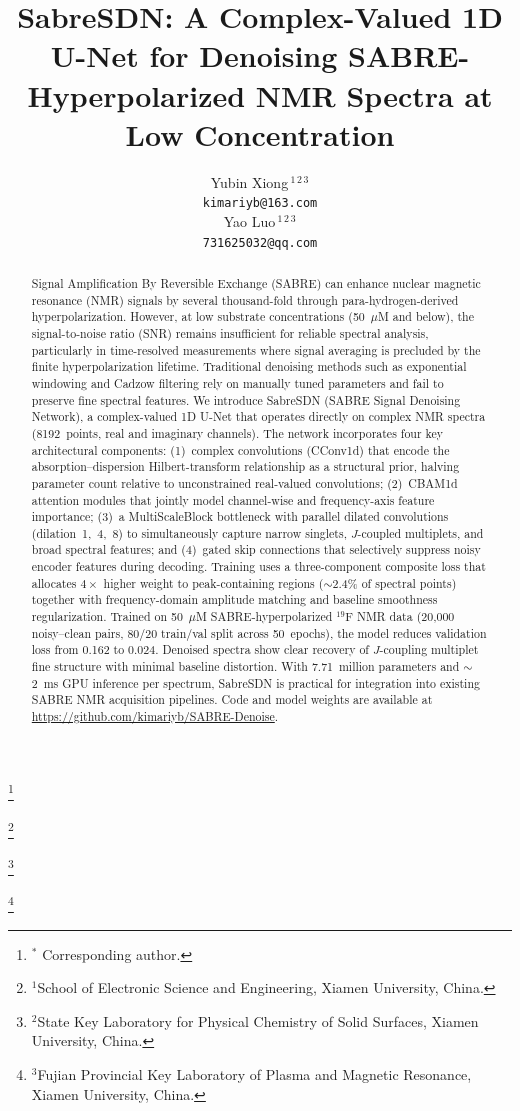 \documentclass{article}
\title{SabreSDN: A Complex-Valued 1D U-Net for Denoising SABRE-Hyperpolarized NMR Spectra at Low Concentration}
\author{%
  Yubin Xiong\,$^{1\,2\,3}$ \\
  \texttt{kimariyb@163.com} \\
  \And
  Yao Luo\footnotemark[1]\;\,${}^{1\,2\,3}$\\
  \texttt{731625032@qq.com} 
}
\newcommand\blfootnote[1]{%
  \begingroup
  \renewcommand\thefootnote{}\footnote{#1}%
  \addtocounter{footnote}{-1}%
  \endgroup
}
\begin{document}
\maketitle

\begin{abstract}
Signal Amplification By Reversible Exchange (SABRE) can enhance nuclear magnetic resonance (NMR) signals by several thousand-fold through para-hydrogen-derived hyperpolarization. However, at low substrate concentrations (50~$\mu$M and below), the signal-to-noise ratio (SNR) remains insufficient for reliable spectral analysis, particularly in time-resolved measurements where signal averaging is precluded by the finite hyperpolarization lifetime. Traditional denoising methods such as exponential windowing and Cadzow filtering rely on manually tuned parameters and fail to preserve fine spectral features. We introduce SabreSDN (SABRE Signal Denoising Network), a complex-valued 1D U-Net that operates directly on complex NMR spectra (8192~points, real and imaginary channels). The network incorporates four key architectural components: (1)~complex convolutions (CConv1d) that encode the absorption--dispersion Hilbert-transform relationship as a structural prior, halving parameter count relative to unconstrained real-valued convolutions; (2)~CBAM1d attention modules that jointly model channel-wise and frequency-axis feature importance; (3)~a MultiScaleBlock bottleneck with parallel dilated convolutions (dilation~1,~4,~8) to simultaneously capture narrow singlets, $J$-coupled multiplets, and broad spectral features; and (4)~gated skip connections that selectively suppress noisy encoder features during decoding. Training uses a three-component composite loss that allocates $4\times$ higher weight to peak-containing regions ($\sim$2.4\% of spectral points) together with frequency-domain amplitude matching and baseline smoothness regularization. Trained on 50~$\mu$M SABRE-hyperpolarized $^{19}$F NMR data (20,000 noisy--clean pairs, 80/20 train/val split across 50~epochs), the model reduces validation loss from 0.162 to 0.024. Denoised spectra show clear recovery of $J$-coupling multiplet fine structure with minimal baseline distortion. With 7.71~million parameters and $\sim$2~ms GPU inference per spectrum, SabreSDN is practical for integration into existing SABRE NMR acquisition pipelines. Code and model weights are available at \url{https://github.com/kimariyb/SABRE-Denoise}.
\end{abstract}

\blfootnote{\hspace{-6mm}${}^*$ Corresponding author.}
\blfootnote{\hspace{-6mm}$^{1}$School of Electronic Science and Engineering, Xiamen University, China.}
\blfootnote{\hspace{-6mm}$^{2}$State Key Laboratory for Physical Chemistry of Solid Surfaces, Xiamen University, China.}
\blfootnote{\hspace{-6mm}$^{3}$Fujian Provincial Key Laboratory of Plasma and Magnetic Resonance, Xiamen University, China.}
\end{document}
